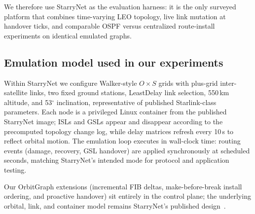We therefore use StarryNet as the evaluation harness: it is the only surveyed
platform that combines time-varying LEO topology, live link mutation at
handover ticks, and comparable OSPF versus centralized route-install
experiments on identical emulated graphs.

\subsection{Emulation model used in our experiments}

Within StarryNet we configure Walker-style $O \times S$ grids with plus-grid
inter-satellite links, two fixed ground stations, LeastDelay link selection,
550\,km altitude, and 53$^\circ$ inclination, representative of published
Starlink-class parameters.
Each node is a privileged Linux container from the published StarryNet image;
ISLs and GSLs appear and disappear according to the precomputed topology
change log, while delay matrices refresh every 10\,s to reflect orbital motion.
The emulation loop executes in wall-clock time: routing events (damage,
recovery, GSL handover) are applied synchronously at scheduled seconds, matching
StarryNet's intended mode for protocol and application testing.

Our OrbitGraph extensions (incremental FIB deltas, make-before-break install
ordering, and proactive handover) sit entirely in the control plane; the
underlying orbital, link, and container model remains StarryNet's published
design~\cite{lai2023starrynet}.
